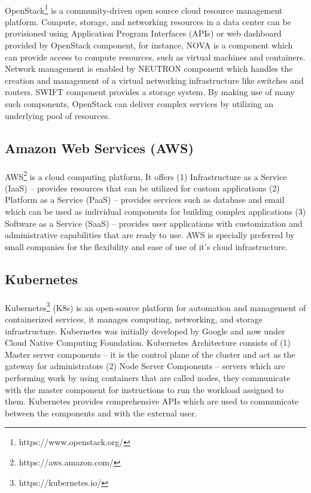 \paragraph{}
OpenStack\footnote{https://www.openstack.org/} is a community-driven open source cloud resource management platform. Compute, storage, and networking resources in a data center can be provisioned using Application Program Interfaces (APIs) or web dashboard provided by OpenStack component, for instance, NOVA is a component which can provide access to compute resources, such as virtual machines and containers. Network management is enabled by NEUTRON component which handles the creation and management of a virtual networking infrastructure like switches and routers. SWIFT component provides a storage system. By making use of many such components, OpenStack can deliver complex services by utilizing an underlying pool of resources.
\subsection{Amazon Web Services (AWS)}
\paragraph{}
AWS\footnote{https://aws.amazon.com/} is a cloud computing platform, It offers (1) Infrastructure as a Service (IaaS) -- provides resources that can be utilized for custom applications (2) Platform as a Service (PaaS) -- provides services such as database and email which can be used as individual components for building complex applications (3) Software as a Service (SaaS) -- provides user applications with customization and administrative capabilities that are ready to use. AWS is specially preferred by small companies for the flexibility and ease of use of it's cloud infrastructure.
\subsection{Kubernetes}
\paragraph{}
Kubernetes\footnote{https://kubernetes.io/} (K8s) is an open-source platform for automation and management of containerized services, it manages computing, networking, and storage infrastructure. Kubernetes was initially developed by Google and now under Cloud Native Computing Foundation. Kubernetes Architecture consists of (1) Master server components -- it is the control plane of the cluster and act as the gateway for  administrators (2) Node Server Components -- servers which are performing work by using containers that are called nodes, they communicate with the master component for instructions to run the workload assigned to them. Kubernetes provides comprehensive APIs which are used to communicate between the components and with the external user.
